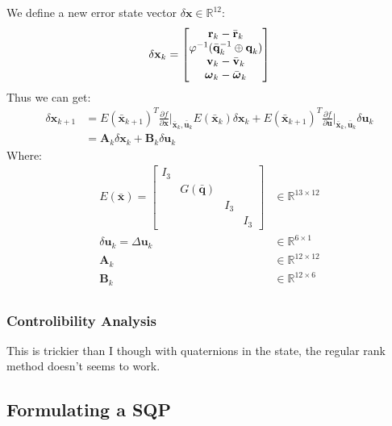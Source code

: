 We define a new error state vector $\delta \textbf{x} \in \mathbb{R}^{12}$:
\begin{equation}
    \delta \textbf{x}_{k} =
    \begin{bmatrix}
        \textbf{r}_k - \bar{\textbf{r}}_k                           \\
        \varphi ^{-1}(\bar{\textbf{q}}_k^{-1} \oplus \textbf{q}_k ) \\
        \textbf{v}_k - \bar{\textbf{v}}_k                           \\
        \text{\boldmath$\omega$}_k - \bar{\text{\boldmath$\omega$}}_k
    \end{bmatrix}
\end{equation}
Thus we can get:
\begin{equation}
    \begin{aligned}
        \delta \textbf{x}_{k+1}
         & = E(\bar{\textbf{x}}_{k+1})^T \frac{\partial f}{\partial \textbf{x}}\Big|_{\bar{\textbf{x}}_k, \bar{\textbf{u}}_k}E(\bar{\textbf{x}}_k) \delta\textbf{x}_k +
        E(\bar{\textbf{x}}_{k+1})^T \frac{\partial f}{\partial \textbf{u}}\Big|_{\bar{\textbf{x}}_k, \bar{\textbf{u}}_k} \delta\textbf{u}_k                             \\
         & = \textbf{A}_k \delta\textbf{x}_k + \textbf{B}_k \delta\textbf{u}_k
    \end{aligned}
\end{equation}
Where:
\begin{align}
    E(\bar{\textbf{x}}) = \begin{bmatrix}
        I_3 &                     &     &     \\
            & G(\bar{\textbf{q}}) &     &     \\
            &                     & I_3 &     \\
            &                     &     & I_3
    \end{bmatrix} & \in \mathbb{R}^{13 \times 12} \\
    \delta \textbf{u}_k = \Delta \textbf{u}_k        & \in \mathbb{R}^{6 \times 1}   \\
    \textbf{A}_k                                     & \in \mathbb{R}^{12 \times 12} \\
    \textbf{B}_k                                     & \in \mathbb{R}^{12 \times 6}  \\
\end{align}


\subsubsection{Controlibility Analysis}\cite{jiang2020controllability}
This is trickier than I though with quaternions in the state, the regular rank method doesn't seems to work.

\subsection{Formulating a SQP}


\pagebreak